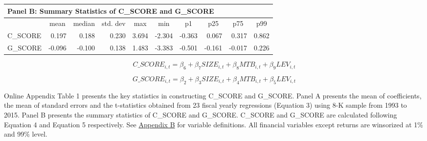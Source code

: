 \begin{table}[H]
	\begin{center}
		\begin{tabular}{lrrrrrrrrr}
			\multicolumn{10}{l}{\textbf{Panel B: Summary Statistics of C\_SCORE and G\_SCORE}}  \\
			\midrule
			\midrule
			& \multicolumn{1}{c}{mean} & \multicolumn{1}{c}{median} & \multicolumn{1}{c}{std. dev} & \multicolumn{1}{c}{max} & \multicolumn{1}{c}{min} & \multicolumn{1}{c}{p1} & \multicolumn{1}{c}{p25} & \multicolumn{1}{c}{p75} & \multicolumn{1}{c}{p99} \\
			\midrule
			C\_SCORE & 0.197 & 0.188 & 0.230 & 3.694 & -2.304 & -0.363 & 0.067 & 0.317 & 0.862 \\
			G\_SCORE & -0.096 & -0.100 & 0.138 & 1.483 & -3.383 & -0.501 & -0.161 & -0.017 & 0.226 \\
			\bottomrule
			\bottomrule
		\end{tabular}%
	\end{center}
		\begin{footnotesize}
			\setcounter{equation}{3}
			\begin{equation}
				C\_SCORE_{i,t} = \beta_6+\beta_7SIZE_{i,t}+\beta_8MTB_{i,t}+\beta_9LEV_{i,t}
			\end{equation}
		
			\begin{equation}
				G\_SCORE_{i,t} = \beta_2+\beta_3SIZE_{i,t}+\beta_4MTB_{i,t}+\beta_5LEV_{i,t}
			\end{equation}
			
			\noindent Online Appendix Table 1 presents the key statistics in constructing C\_SCORE and G\_SCORE. Panel A presents the mean of coefficients, the mean of standard errors and the t-statistics obtained from 23 fiscal yearly regressions (Equation 3) using 8-K sample from 1993 to 2015. Panel B presents the summary statistics of C\_SCORE and G\_SCORE. C\_SCORE and G\_SCORE are calculated following Equation 4 and Equation 5 respectively. See \hyperref[appb]{Appendix B} for variable definitions. All financial variables except returns are winsorized at 1\% and 99\% level. 
		\end{footnotesize}
\end{table}%
